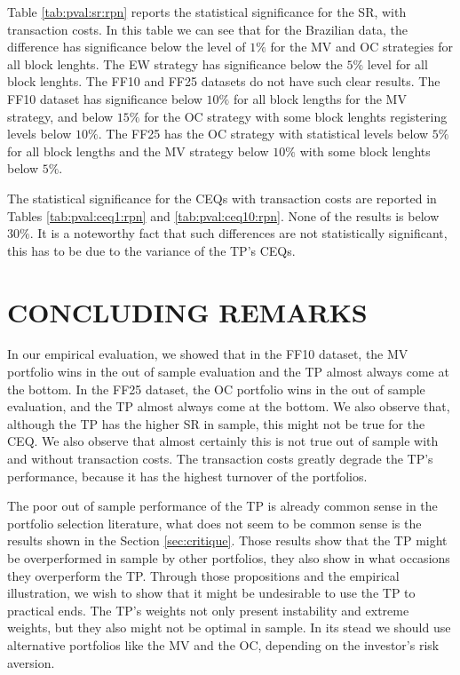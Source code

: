 \documentclass[12pt,oneside,a4paper]{memoir}
\begin{document}
Table \ref{tab:pval:sr:rpn} reports the statistical significance for the SR, with transaction costs.
In this table we can see that for the Brazilian data, the difference has significance below the level of $1 \%$ for the MV and OC strategies for all block lenghts.
The EW strategy has significance below the $5 \%$ level for all block lenghts.
The FF10 and FF25 datasets do not have such clear results.
The FF10 dataset has significance below $10 \%$ for all block lengths for the MV strategy, and below $15 \%$ for the OC strategy with some block lenghts registering levels below $10 \%$.
The FF25 has the OC strategy with statistical levels below $5 \%$ for all block lengths and the MV strategy below $10 \%$ with some block lenghts below $5\%$.

The statistical significance for the CEQs with transaction costs are reported in Tables \ref{tab:pval:ceq1:rpn} and \ref{tab:pval:ceq10:rpn}.
None of the results is below $30 \%$.
It is a noteworthy fact that such differences are not statistically significant, this has to be due to the variance of the TP's CEQs.


\section{CONCLUDING REMARKS} \label{sec:conc:tp}

In our empirical evaluation, we showed that in the FF10 dataset, the MV portfolio wins in the out of sample evaluation and the TP almost always come at the bottom. In the FF25 dataset, the OC portfolio wins in the out of sample evaluation, and the TP almost always come at the bottom. We also observe that, although the TP has the higher SR in sample, this might not be true for the CEQ. We also observe that almost certainly this is not true out of sample with and without transaction costs. The transaction costs greatly degrade the TP's performance, because it has the highest turnover of the portfolios.

The poor out of sample performance of the TP is already common sense in the portfolio selection literature, what does not seem to be common sense is the results shown in the Section \ref{sec:critique}. Those results show that the TP might be overperformed in sample by other portfolios, they also show in what occasions they overperform the TP. Through those propositions and the empirical illustration, we wish to show that it might be undesirable to use the TP to practical ends. The TP's weights not only present instability and extreme weights, but they also might not be optimal in sample. In its stead we should use alternative portfolios like the MV and the OC, depending on the investor's risk aversion.
\end{document}
